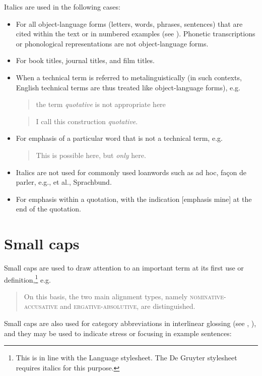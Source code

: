 \documentclass[a4paper]{article}
\newenvironment{gsrexq}{\begin{quote}\color{blue}}{\end{quote}}
\newcommand{\gsrex}[1]{{\color{blue}#1}}
\begin{document}
Italics are used in the following cases:
\begin{itemize}
\item For all object-language forms (letters, words, phrases, sentences) that are cited within the text or in numbered examples (see ). Phonetic transcriptions or phonological representations are not object-language forms.
\item For book titles, journal titles, and film titles.
\item When a technical term is referred to metalinguistically (in such contexts, English technical terms are thus treated like object-language forms), e.g.
  \begin{gsrexq}
    the term \textit{quotative} is not appropriate here
  \end{gsrexq} 
  \begin{gsrexq}
    I call this construction \textit{quotative}.
  \end{gsrexq}
\item For emphasis of a particular word that is not a technical term, e.g.
  \begin{gsrexq}
    This is possible here, but \textit{only} here.
  \end{gsrexq} 
\item Italics are not used for commonly used loanwords such as \gsrex{ad hoc}, \gsrex{façon de parler}, \gsrex{e.g.}, \gsrex{et al.}, \gsrex{Sprachbund}.
\item For emphasis within a quotation, with the indication [emphasis mine] at the end of the quotation.
\end{itemize}


\section{Small caps}\label{sec:small-caps}

Small caps are used to draw attention to an important term at its first
use or definition,\footnote{This is in line with the Language stylesheet.
The De Gruyter stylesheet requires italics for this purpose.} e.g.

\begin{gsrexq}
On this basis, the two main alignment types, namely 
\textsc{nominative-accusative}
and 
\textsc{ergative-absolutive}, 
are distinguished. 
\end{gsrexq}

Small caps are also used
for category abbreviations in interlinear glossing (see , ), and
they may be used to indicate stress or focusing in example sentences:
\end{document}
